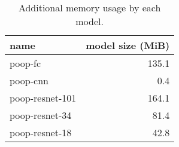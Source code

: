 \begin{table}[ht]
    \centering
    \caption{Additional memory usage by each model.}
    \label{tab:Results:Computation:Memory}
    \begin{tabular}{lr}
        \hline
        name & model size (MiB) \\
        \hline
        \acs{poop}-\acs{fc}         & 135.1 \\
        \acs{poop}-\acs{cnn}        &   0.4 \\
        \acs{poop}-\acs{resnet}-101 & 164.1 \\
        \acs{poop}-\acs{resnet}-34  &  81.4 \\
        \acs{poop}-\acs{resnet}-18  &  42.8 \\
    \end{tabular}
\end{table}

